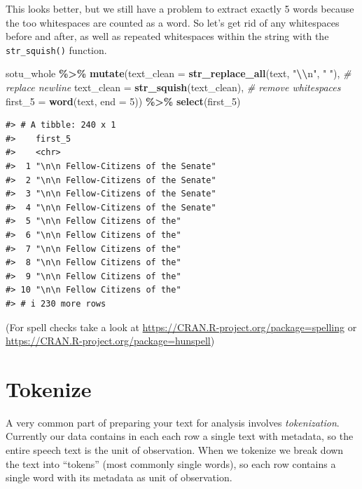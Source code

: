 \documentclass[
]{book}
\newenvironment{Shaded}{\begin{snugshade}}{\end{snugshade}}
\newcommand{\AttributeTok}[1]{\textcolor[rgb]{0.13,0.29,0.53}{#1}}
\newcommand{\CommentTok}[1]{\textcolor[rgb]{0.56,0.35,0.01}{\textit{#1}}}
\newcommand{\DecValTok}[1]{\textcolor[rgb]{0.00,0.00,0.81}{#1}}
\newcommand{\FunctionTok}[1]{\textcolor[rgb]{0.13,0.29,0.53}{\textbf{#1}}}
\newcommand{\NormalTok}[1]{#1}
\newcommand{\SpecialCharTok}[1]{\textcolor[rgb]{0.81,0.36,0.00}{\textbf{#1}}}
\newcommand{\StringTok}[1]{\textcolor[rgb]{0.31,0.60,0.02}{#1}}
\begin{document}
This looks better, but we still have a problem to extract exactly 5 words because the too whitespaces are counted as a word. So let's get rid of any whitespaces before and after, as well as repeated whitespaces within the string with the \texttt{str\_squish()} function.

\begin{Shaded}
\begin{Highlighting}[]
\NormalTok{sotu\_whole }\SpecialCharTok{\%\textgreater{}\%} 
  \FunctionTok{mutate}\NormalTok{(}\AttributeTok{text\_clean =} \FunctionTok{str\_replace\_all}\NormalTok{(text, }\StringTok{"}\SpecialCharTok{\textbackslash{}\textbackslash{}}\StringTok{n"}\NormalTok{, }\StringTok{" "}\NormalTok{), }\CommentTok{\# replace newline}
         \AttributeTok{text\_clean =} \FunctionTok{str\_squish}\NormalTok{(text\_clean),  }\CommentTok{\# remove whitespaces}
         \AttributeTok{first\_5 =} \FunctionTok{word}\NormalTok{(text, }\AttributeTok{end =} \DecValTok{5}\NormalTok{)) }\SpecialCharTok{\%\textgreater{}\%} 
  \FunctionTok{select}\NormalTok{(first\_5)}
\end{Highlighting}
\end{Shaded}

\begin{verbatim}
#> # A tibble: 240 x 1
#>    first_5                             
#>    <chr>                               
#>  1 "\n\n Fellow-Citizens of the Senate"
#>  2 "\n\n Fellow-Citizens of the Senate"
#>  3 "\n\n Fellow-Citizens of the Senate"
#>  4 "\n\n Fellow-Citizens of the Senate"
#>  5 "\n\n Fellow Citizens of the"       
#>  6 "\n\n Fellow Citizens of the"       
#>  7 "\n\n Fellow Citizens of the"       
#>  8 "\n\n Fellow Citizens of the"       
#>  9 "\n\n Fellow Citizens of the"       
#> 10 "\n\n Fellow Citizens of the"       
#> # i 230 more rows
\end{verbatim}

(For spell checks take a look at \url{https://CRAN.R-project.org/package=spelling} or \url{https://CRAN.R-project.org/package=hunspell})

\section{Tokenize}\label{tokenize}

A very common part of preparing your text for analysis involves \emph{tokenization}. Currently our data contains in each each row a single text with metadata, so the entire speech text is the unit of observation. When we tokenize we break down the text into ``tokens'' (most commonly single words), so each row contains a single word with its metadata as unit of observation.
\end{document}
